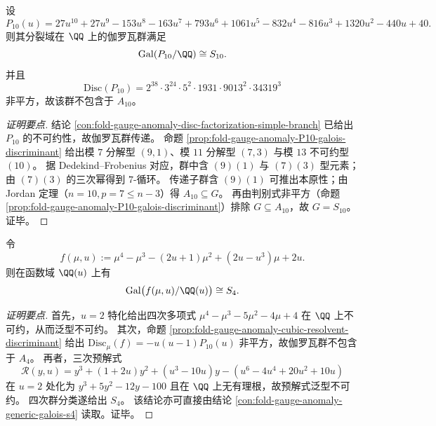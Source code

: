 \begin{conclusion}[分歧十次多项式的满对称伽罗瓦群判定]\label{con:fold-gauge-anomaly-p10-galois-s10}
设
\[
P_{10}(u)=27u^{10}+27u^9-153u^8-163u^7+793u^6+1061u^5-832u^4-816u^3+1320u^2-440u+40.
\]
则其分裂域在 \(\QQ\) 上的伽罗瓦群满足
\[
\mathrm{Gal}(P_{10}/\QQ)\cong S_{10}.
\]
并且
\[
\mathrm{Disc}(P_{10})=2^{38}\cdot 3^{24}\cdot 5^{2}\cdot 1931\cdot 9013^{2}\cdot 34319^{3}
\]
非平方，故该群不包含于 \(A_{10}\)。
\end{conclusion}
\begin{proof}[证明要点]
结论 \ref{con:fold-gauge-anomaly-disc-factorization-simple-branch} 已给出 \(P_{10}\) 的不可约性，故伽罗瓦群传递。
命题 \ref{prop:fold-gauge-anomaly-P10-galois-discriminant} 给出模 \(7\) 分解型 \((9,1)\)、模 \(11\) 分解型 \((7,3)\) 与模 \(13\) 不可约型 \((10)\)。
据 Dedekind--Frobenius 对应，群中含 \((9)(1)\) 与 \((7)(3)\) 型元素；由 \((7)(3)\) 的三次幂得到 \(7\)-循环。
传递子群含 \((9)(1)\) 可推出本原性；由 Jordan 定理（\(n=10,p=7\le n-3\)）得 \(A_{10}\subseteq G\)。
再由判别式非平方（命题 \ref{prop:fold-gauge-anomaly-P10-galois-discriminant}）排除 \(G\subseteq A_{10}\)，故 \(G=S_{10}\)。证毕。
\end{proof}

\begin{conclusion}\label{con:fold-gauge-anomaly-quartic-galois-s4}
令
\[
f(\mu,u):=\mu^4-\mu^3-(2u+1)\mu^2+(2u-u^3)\mu+2u.
\]
则在函数域 \(\QQ(u)\) 上有
\[
\mathrm{Gal}\bigl(f(\mu,u)/\QQ(u)\bigr)\cong S_4.
\]
\end{conclusion}
\begin{proof}[证明要点]
首先，\(u=2\) 特化给出四次多项式
\(
\mu^4-\mu^3-5\mu^2-4\mu+4
\)
在 \(\QQ\) 上不可约，从而泛型不可约。
其次，命题 \ref{prop:fold-gauge-anomaly-cubic-resolvent-discriminant} 给出
\(
\mathrm{Disc}_\mu(f)=-u(u-1)P_{10}(u)
\)
非平方，故伽罗瓦群不包含于 \(A_4\)。
再者，三次预解式
\[
\mathcal R(y,u)=y^3+(1+2u)y^2+(u^3-10u)y-(u^6-4u^4+20u^2+10u)
\]
在 \(u=2\) 处化为
\(
y^3+5y^2-12y-100
\)
且在 \(\QQ\) 上无有理根，故预解式泛型不可约。
四次群分类遂给出 \(S_4\)。
该结论亦可直接由结论 \ref{con:fold-gauge-anomaly-generic-galois-s4} 读取。证毕。
\end{proof}

